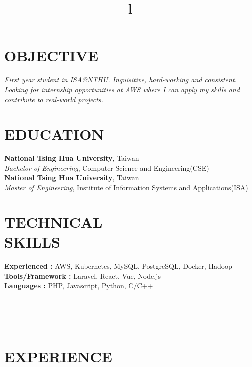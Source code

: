 \documentclass[margin]{res}
\begin{document}
\begin{resume}
\section{OBJECTIVE}
{\sl First year student in ISA@NTHU. Inquisitive, hard-working and consistent. Looking for internship opportunities at AWS where I can apply my skills and contribute to real-world projects. }

\section{EDUCATION}
\textbf{National Tsing Hua University}, Taiwan\\
{\sl Bachelor of Engineering}, Computer Science and Engineering(CSE)\\
\textbf{National Tsing Hua University}, Taiwan \\
{\sl Master of Engineering}, Institute of Information Systems and Applications(ISA) 
\section{TECHNICAL\\SKILLS}

\textbf{Experienced : } AWS, Kubernetes, MySQL, PostgreSQL, Docker, Hadoop
\\
\textbf{Tools/Framework : } Laravel, React, Vue, Node.js
\\
\textbf{Languages : } PHP, Javascript, Python, C/C++

\begin{format}
\title{l}\\
\\
\body\\
\end{format}

\section{EXPERIENCE}


\end{resume}
\end{document}
